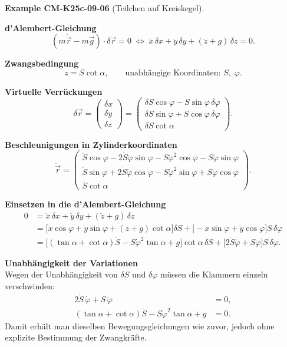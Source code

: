 \documentclass[10pt, letterpaper]{article}
\newcommand{\CustomHeading}[3]{%
  \par\medskip\noindent%
  \textbf{#1 #2} \textnormal{(#3)}.\enskip%
}
\newenvironment{EXA}[2]{\begin{unitbox}\CustomHeading{Example}{#1}{#2}}{\end{unitbox}}
\begin{document}
\begin{EXA}{CM-K25c-09-06}{Teilchen auf Kreiskegel}
\textbf{d'Alembert-Gleichung}\\
\[
  (m\ddot{\vec r}-m\vec g)\!\cdot\!\delta\vec r = 0
  \;\Longleftrightarrow\;
  \ddot x\,\delta x + \ddot y\,\delta y + (\ddot z + g)\,\delta z = 0 .
\]

\textbf{Zwangsbedingung}\\
\[
  z = S\cot\alpha,
  \qquad\text{unabhängige Koordinaten: } S,\;\varphi .
\]

\textbf{Virtuelle Verrückungen}\\[-6pt]
\[
  \delta\vec r=
  \begin{pmatrix}
    \delta x\\ \delta y\\ \delta z
  \end{pmatrix}
  =
  \begin{pmatrix}
    \delta S\cos\varphi - S\sin\varphi\,\delta\varphi\\[2pt]
    \delta S\sin\varphi + S\cos\varphi\,\delta\varphi\\[2pt]
    \delta S\cot\alpha
  \end{pmatrix}.
\]

\textbf{Beschleunigungen in Zylinderkoordinaten}\\[-6pt]
\[
  \ddot{\vec r}=
  \begin{pmatrix}
    \ddot S\cos\varphi - 2\dot S\dot\varphi\sin\varphi
      - S\dot\varphi^{2}\cos\varphi - S\ddot\varphi\sin\varphi\\[2pt]
    \ddot S\sin\varphi + 2\dot S\dot\varphi\cos\varphi
      - S\dot\varphi^{2}\sin\varphi + S\ddot\varphi\cos\varphi\\[2pt]
    \ddot S\cot\alpha
  \end{pmatrix}.
\]

\textbf{Einsetzen in die d'Alembert-Gleichung}\\[-6pt]
\[
\begin{aligned}
  0 &=
  \ddot x\,\delta x + \ddot y\,\delta y + (\ddot z+g)\,\delta z \\[4pt]
    &=
  \bigl[\ddot x\cos\varphi+\ddot y\sin\varphi + (\ddot z+g)\cot\alpha\bigr]\delta S
  +\bigl[-\ddot x\sin\varphi + \ddot y\cos\varphi\bigr]S\,\delta\varphi \\[4pt]
    &=
  \bigl[(\tan\alpha+\cot\alpha)\ddot S
        - S\dot\varphi^{2}\tan\alpha + g\bigr]\cot\alpha\,\delta S
  +\bigl[2\dot S\dot\varphi + S\ddot\varphi\bigr]S\,\delta\varphi .
\end{aligned}
\]

\textbf{Unabhängigkeit der Variationen}\\
Wegen der Unabhängigkeit von $\delta S$ und $\delta\varphi$ müssen die
Klammern einzeln verschwinden:
\[
  \boxed{
  \begin{aligned}
    2\dot S\,\dot\varphi + S\,\ddot\varphi &= 0,\\[2pt]
    (\tan\alpha+\cot\alpha)\ddot S
      - S\dot\varphi^{2}\tan\alpha + g &= 0.
  \end{aligned}}
\]
Damit erhält man dieselben Bewegungsgleichungen wie zuvor, jedoch ohne
explizite Bestimmung der Zwangkräfte.
\end{EXA}
\end{document}
